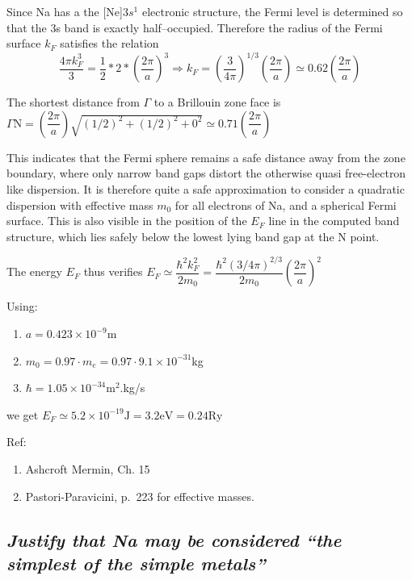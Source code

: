 \documentclass{article}
\begin{document}
Since Na has a the {[}Ne{]}$3s^1$ electronic structure, the Fermi level
is determined so that the 3s band is exactly half--occupied. Therefore
the radius of the Fermi surface $k_F$ satisfies the relation
\[\dfrac{4 \pi k_F^3}{3}=\dfrac{1}{2}*2*\left(\dfrac{2\pi}{a}\right)^3 \Rightarrow k_F = \left(\dfrac{3}{4\pi}\right)^{1/3}\left(\dfrac{2\pi}{a}\right) \simeq 0.62 \left(\dfrac{2\pi}{a}\right)\]

The shortest distance from $\Gamma$ to a Brillouin zone face is
$\Gamma \text{N} = \left(\dfrac{2\pi}{a}\right) \sqrt{(1/2)^2+(1/2)^2+0^2} \simeq 0.71 \left(\dfrac{2\pi}{a}\right)$

This indicates that the Fermi sphere remains a safe distance away from
the zone boundary, where only narrow band gaps distort the otherwise
quasi free-electron like dispersion. It is therefore quite a safe
approximation to consider a quadratic dispersion with effective mass
$m_0$ for all electrons of Na, and a spherical Fermi surface. This is
also visible in the position of the $E_F$ line in the computed band
structure, which lies safely below the lowest lying band gap at the N
point.

The energy $E_F$ thus verifies
$E_F \simeq \dfrac{\hbar^2 k_F^2}{2m_0} = \dfrac{\hbar^2(3/4\pi)^{2/3}}{2m_0}\left(\dfrac{2\pi}{a}\right)^2$

Using:

\begin{enumerate}
\def\labelenumi{\arabic{enumi}.}
\itemsep1pt\parskip0pt
\item
  $a=0.423 \times 10^{-9}$m
\item
  $m_0 = 0.97 \cdot m_e = 0.97 \cdot 9.1 \times 10^{-31}$kg
\item
  $\hbar = 1.05 \times 10^{-34}\text{m}^2$.kg/s
\end{enumerate}

we get
$E_F \simeq 5.2 \times 10^{-19}\text{J} = 3.2 \text{eV} = 0.24 \text{Ry}$

Ref:

\begin{enumerate}
\def\labelenumi{\arabic{enumi}.}
\itemsep1pt\parskip0pt
\item
  Ashcroft Mermin, Ch. 15
\item
  Pastori-Paravicini, p.~223 for effective masses.
\end{enumerate}


    \subsection{\emph{Justify that Na may be considered ``the simplest of the simple
metals''}}
\end{document}
